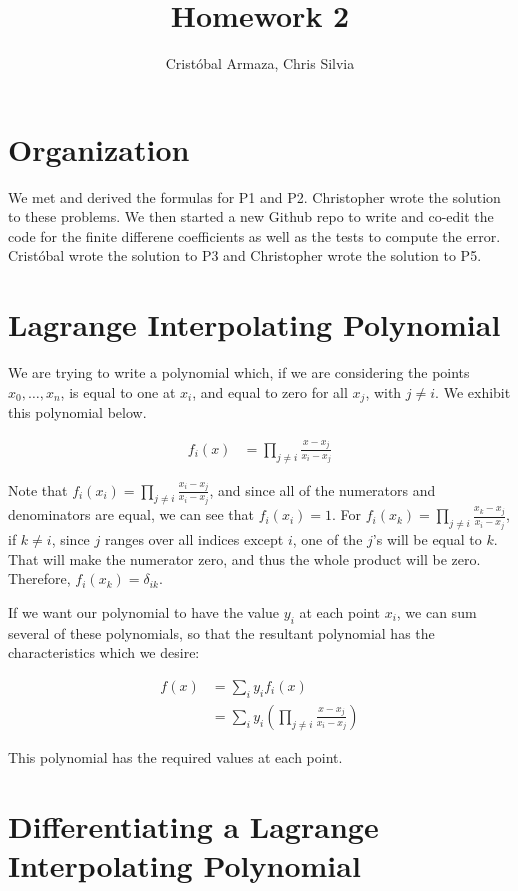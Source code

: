 \documentclass{article}
\title{Homework 2}
\author{Crist\'obal Armaza, Chris Silvia}
\begin{document}
\maketitle

\section*{Organization}

We met and derived the formulas for P1 and P2. Christopher wrote the solution to these problems.
We then started a new Github repo to write and co-edit the code for the finite differene coefficients
as well as the tests to compute the error. Crist\'obal wrote the solution to P3 and Christopher
wrote the solution to P5.

\section{Lagrange Interpolating Polynomial}

We are trying to write a polynomial which, if we are considering
	the points $x_0, \dots, x_n$, is equal to one at $x_i$,
	and equal to zero for all $x_j$, with $j \neq i$.
We exhibit this polynomial below.

\begin{align}
f_i(x) & = \prod_{j \neq i} \frac{x - x_j}{x_i - x_j}
\end{align}

Note that $f_i(x_i) = \prod_{j \neq i} \frac{x_i - x_j}{x_i - x_j}$,
	and since all of the numerators and denominators are equal,
	we can see that $f_i(x_i) = 1$.
For $f_i(x_k) = \prod_{j \neq i} \frac{x_k - x_j}{x_i - x_j}$,
	if $k \neq i$, since $j$ ranges over all indices except $i$,
	one of the $j$'s will be equal to $k$.
That will make the numerator zero, and thus the whole product
	will be zero.
Therefore, $f_i(x_k) = \delta_{ik}$.

If we want our polynomial to have the value $y_i$ at each
	point $x_i$, we can sum several of these polynomials, so that
	the resultant polynomial has the characteristics which we desire:

\begin{align}
f(x) & = \sum_i y_i f_i(x) \\
& = \sum_i y_i 
	\left( \prod_{j \neq i} \frac{x-x_j}{x_i-x_j} \right)
\end{align}

This polynomial has the required values at each point.

\section{Differentiating a Lagrange Interpolating Polynomial}
\end{document}
